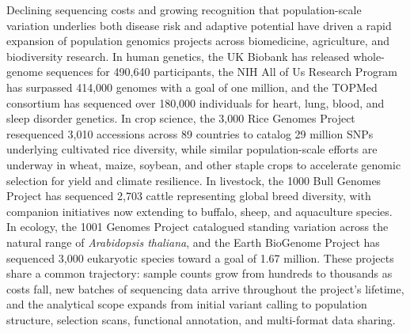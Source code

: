 \documentclass[11pt,a4paper]{article}
\begin{document}
Declining sequencing costs and growing recognition that population-scale variation underlies both disease risk and adaptive potential have driven a rapid expansion of population genomics projects across biomedicine, agriculture, and biodiversity research. In human genetics, the UK Biobank has released whole-genome sequences for 490,640 participants, the NIH All of Us Research Program has surpassed 414,000 genomes with a goal of one million, and the TOPMed consortium has sequenced over 180,000 individuals for heart, lung, blood, and sleep disorder genetics. In crop science, the 3,000 Rice Genomes Project resequenced 3,010 accessions across 89 countries to catalog 29 million SNPs underlying cultivated rice diversity, while similar population-scale efforts are underway in wheat, maize, soybean, and other staple crops to accelerate genomic selection for yield and climate resilience. In livestock, the 1000 Bull Genomes Project has sequenced 2,703 cattle representing global breed diversity, with companion initiatives now extending to buffalo, sheep, and aquaculture species. In ecology, the 1001 Genomes Project catalogued standing variation across the natural range of \textit{Arabidopsis thaliana}, and the Earth BioGenome Project has sequenced 3,000 eukaryotic species toward a goal of 1.67 million. These projects share a common trajectory: sample counts grow from hundreds to thousands as costs fall, new batches of sequencing data arrive throughout the project's lifetime, and the analytical scope expands from initial variant calling to population structure, selection scans, functional annotation, and multi-format data sharing.
\end{document}

